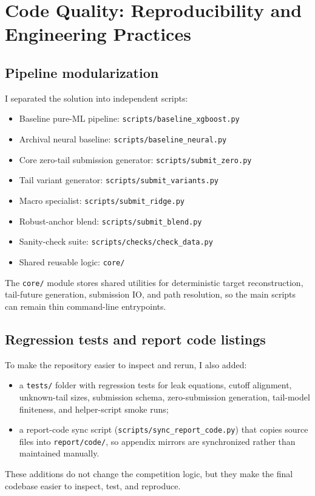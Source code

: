 \section{Code Quality: Reproducibility and Engineering Practices}

\subsection{Pipeline modularization}
I separated the solution into independent scripts:
\begin{itemize}[leftmargin=1.5em]
  \item Baseline pure-ML pipeline: \texttt{scripts/baseline\_xgboost.py}
  \item Archival neural baseline: \texttt{scripts/baseline\_neural.py}
  \item Core zero-tail submission generator: \texttt{scripts/submit\_zero.py}
  \item Tail variant generator: \texttt{scripts/submit\_variants.py}
  \item Macro specialist: \texttt{scripts/submit\_ridge.py}
  \item Robust-anchor blend: \texttt{scripts/submit\_blend.py}
  \item Sanity-check suite: \texttt{scripts/checks/check\_data.py}
  \item Shared reusable logic: \texttt{core/}
\end{itemize}
The \texttt{core/} module stores shared utilities for deterministic target reconstruction, tail-future generation, submission IO, and path resolution, so the main scripts can remain thin command-line entrypoints.

\subsection{Regression tests and report code listings}
To make the repository easier to inspect and rerun, I also added:
\begin{itemize}[leftmargin=1.5em]
  \item a \texttt{tests/} folder with regression tests for leak equations, cutoff alignment, unknown-tail sizes, submission schema, zero-submission generation, tail-model finiteness, and helper-script smoke runs;
  \item a report-code sync script (\texttt{scripts/sync\_report\_code.py}) that copies source files into \texttt{report/code/}, so appendix mirrors are synchronized rather than maintained manually.
\end{itemize}
These additions do not change the competition logic, but they make the final codebase easier to inspect, test, and reproduce.

